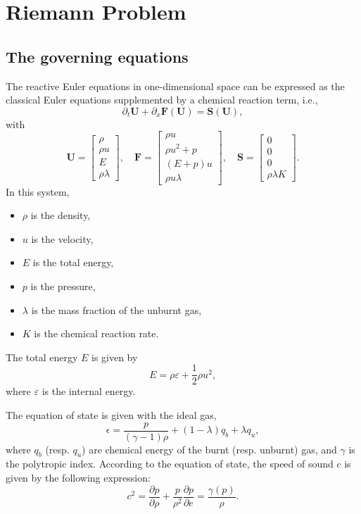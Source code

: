 \section{Riemann Problem}
\subsection{The governing equations}
The reactive Euler equations in one-dimensional space can be expressed as the classical Euler equations supplemented by a chemical reaction term, i.e.,
\begin{equation}
\partial_t \mathbf{U} + \partial_x \mathbf{F}(\mathbf{U}) = \mathbf{S}(\mathbf{U}),
\end{equation}
with
\begin{equation}
\boldsymbol{U} = \begin{bmatrix} \rho \\ \rho u \\ E \\ \rho \lambda \end{bmatrix}, \quad
\boldsymbol{F} = \begin{bmatrix} \rho u \\ \rho u^2 + p \\  (E+p)u \\ \rho u \lambda  \end{bmatrix}, \quad
\boldsymbol{S} = \begin{bmatrix} 0 \\ 0 \\ 0 \\ \rho \lambda K\end{bmatrix}.
\end{equation}
In this system,
\begin{itemize}
  \item $\rho$ is the density,
  \item $u$ is the velocity,
  \item $E$ is the total energy,
  \item $p$ is the pressure,
  \item $\lambda$ is the mass fraction of the unburnt gas,
  \item $K$ is the chemical reaction rate.
\end{itemize}
The total energy $E$ is given by
\begin{equation}
E = \rho \varepsilon + \frac{1}{2} \rho u^2,
\end{equation} 
where $\varepsilon$ is the internal energy.

The equation of state is given with the ideal gas,
\begin{equation}
\epsilon  = \frac{p}{(\gamma - 1) \rho} + (1-\lambda) q_b + \lambda q_u,
\label{eq:EOS}
\end{equation}
where $q_b$ (resp. $q_u$) are chemical energy of the burnt (resp. unburnt) gas, and $\gamma$ is the polytropic index.
According to the equation of state, the speed of sound 
$c$ is given by the following expression:
\begin{equation}
  c^2 = \frac{\partial p}{\partial \rho}+\frac{p}{\rho^2}\frac{\partial p}{\partial e}
  = \frac{\gamma(p)}{\rho}.
\end{equation}

